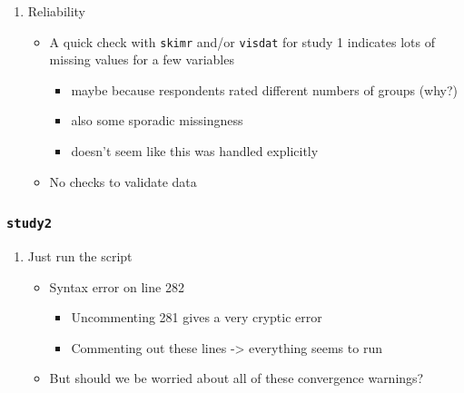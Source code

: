 \documentclass[
]{article}
\providecommand{\tightlist}{%
  \setlength{\itemsep}{0pt}\setlength{\parskip}{0pt}}
\begin{document}
\begin{enumerate}
  \begin{itemize}
  \tightlist
  \item
    Line 46: Looks like we're starting one section of the analysis

    \begin{itemize}
    \tightlist
    \item
      But it's easy to miss this section break, similar breaks eg line 134
    \item
      Contrast very visible break on 199
    \end{itemize}
  \item
    What are these tests, plots, and why are we doing them?
  \item
    Contrast with the factor analysis starting on line 79
  \item
    Lines 116-17: Did they solve the ``this is bad''?
  \end{itemize}
\item
  Reliability

  \begin{itemize}
  \tightlist
  \item
    A quick check with \texttt{skimr} and/or \texttt{visdat} for study 1 indicates lots of missing values for a few variables

    \begin{itemize}
    \tightlist
    \item
      maybe because respondents rated different numbers of groups (why?)
    \item
      also some sporadic missingness
    \item
      doesn't seem like this was handled explicitly
    \end{itemize}
  \item
    No checks to validate data
  \end{itemize}
\end{enumerate}

\hypertarget{study2}{%
\subsubsection{\texorpdfstring{\texttt{study2}}{study2}}\label{study2}}

\begin{enumerate}
\def\labelenumi{\arabic{enumi}.}
\setcounter{enumi}{-1}
\tightlist
\item
  Just run the script

  \begin{itemize}
  \tightlist
  \item
    Syntax error on line 282

    \begin{itemize}
    \tightlist
    \item
      Uncommenting 281 gives a very cryptic error
    \item
      Commenting out these lines -\textgreater{} everything seems to run
    \end{itemize}
  \item
    But should we be worried about all of these convergence warnings?
  \end{itemize}
\end{enumerate}
\end{document}
